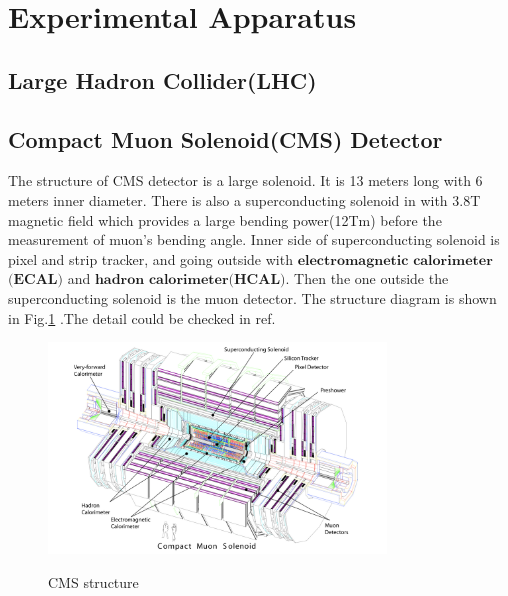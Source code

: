 

\clearpage
\section{Experimental Apparatus}
\label{sec:ExperimentalAppratus}

	\subsection{Large Hadron Collider(LHC)}
	\label{ssec:ExpApp_LHC}

	\subsection{Compact Muon Solenoid(CMS) Detector}
	\label{ssec:ExpApp_CMS}

		The structure of CMS detector is a large solenoid. It is 13 meters long with 6 meters inner diameter. There is also a superconducting solenoid in with 3.8T magnetic field which provides a large bending power(12Tm) before the measurement of muon's bending angle. Inner side of superconducting solenoid is pixel and strip tracker, and going outside with $\textbf{electromagnetic}$ $\textbf{calorimeter}$$\textbf{(ECAL)}$ and $\textbf{hadron}$ $\textbf{calorimeter}$$\textbf{(HCAL)}$. Then the one outside the superconducting solenoid is the muon detector. The structure diagram is shown in Fig.\ref{ExpApp:fig:CMS_structure} .The detail could be checked in ref.\cite{Chatrchyan:2008aa}

		\begin{figure}[H]
		\centering{}
	    	\includegraphics[width=0.8\textwidth]{Figures/ExpApparatus/CMS_detector.png}\\
		\caption{CMS structure\cite{Chatrchyan:2008aa}}
		\label{ExpApp:fig:CMS_structure}
		\end{figure}
		\FloatBarrier

